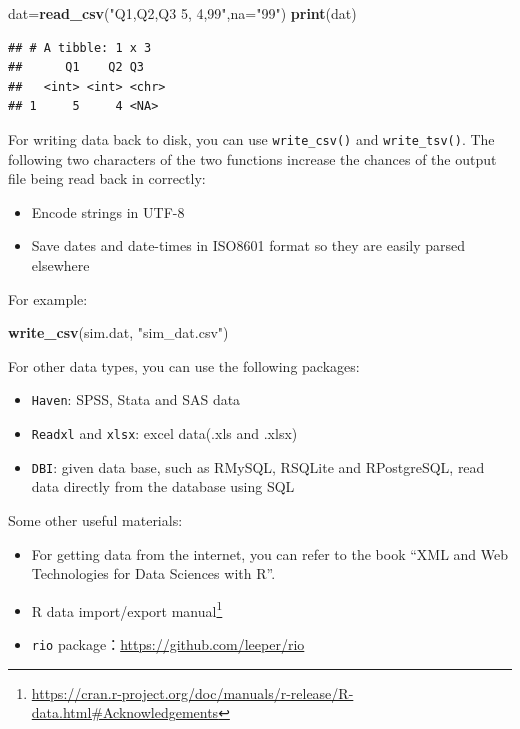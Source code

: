 \documentclass[12pt,]{krantz}
\newenvironment{Shaded}{\begin{snugshade}}{\end{snugshade}}
\newcommand{\KeywordTok}[1]{\textcolor[rgb]{0.13,0.29,0.53}{\textbf{#1}}}
\newcommand{\DataTypeTok}[1]{\textcolor[rgb]{0.13,0.29,0.53}{#1}}
\newcommand{\StringTok}[1]{\textcolor[rgb]{0.31,0.60,0.02}{#1}}
\newcommand{\NormalTok}[1]{#1}
\providecommand{\tightlist}{%
  \setlength{\itemsep}{0pt}\setlength{\parskip}{0pt}}
\renewcommand{\href}[2]{#2\footnote{\url{#1}}}
\theoremstyle{definition}
\theoremstyle{definition}
\theoremstyle{definition}
\theoremstyle{remark}
\begin{document}
\begin{Shaded}
\begin{Highlighting}[]
\NormalTok{dat=}\KeywordTok{read_csv}\NormalTok{(}\StringTok{"Q1,Q2,Q3}
\StringTok{               5, 4,99"}\NormalTok{,}\DataTypeTok{na=}\StringTok{"99"}\NormalTok{)}
\KeywordTok{print}\NormalTok{(dat)}
\end{Highlighting}
\end{Shaded}

\begin{verbatim}
## # A tibble: 1 x 3
##      Q1    Q2 Q3   
##   <int> <int> <chr>
## 1     5     4 <NA>
\end{verbatim}

For writing data back to disk, you can use \texttt{write\_csv()} and
\texttt{write\_tsv()}. The following two characters of the two functions
increase the chances of the output file being read back in correctly:

\begin{itemize}
\tightlist
\item
  Encode strings in UTF-8
\item
  Save dates and date-times in ISO8601 format so they are easily parsed
  elsewhere
\end{itemize}

For example:

\begin{Shaded}
\begin{Highlighting}[]
\KeywordTok{write_csv}\NormalTok{(sim.dat, }\StringTok{"sim_dat.csv"}\NormalTok{)}
\end{Highlighting}
\end{Shaded}

For other data types, you can use the following packages:

\begin{itemize}
\tightlist
\item
  \texttt{Haven}: SPSS, Stata and SAS data
\item
  \texttt{Readxl} and \texttt{xlsx}: excel data(.xls and .xlsx)
\item
  \texttt{DBI}: given data base, such as RMySQL, RSQLite and
  RPostgreSQL, read data directly from the database using SQL
\end{itemize}

Some other useful materials:

\begin{itemize}
\tightlist
\item
  For getting data from the internet, you can refer to the book ``XML
  and Web Technologies for Data Sciences with R''.\\
\item
  \href{https://cran.r-project.org/doc/manuals/r-release/R-data.html\#Acknowledgements}{R
  data import/export manual}
\item
  \texttt{rio} package：\url{https://github.com/leeper/rio}
\end{itemize}
\end{document}
